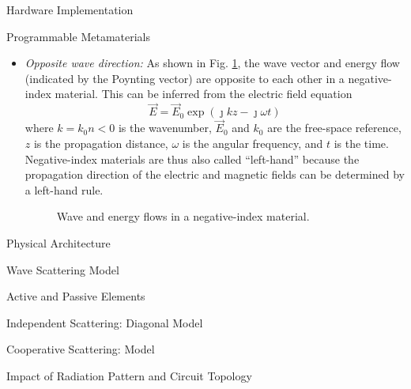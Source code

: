 \begin{section}{}
\begin{subsection}{Hardware Implementation}
\begin{subsubsection}{Programmable Metamaterials}
\begin{itemize}
				\item \emph{Opposite wave direction:} As shown in Fig. \ref{fg:nim_flows}, the wave vector and energy flow (indicated by the Poynting vector) are opposite to each other in a negative-index material. This can be inferred from the electric field equation
				\begin{equation}
					\vec{E} = \vec{E}_0 \exp(\jmath k z - \jmath \omega t)
				\end{equation}
				where $k = k_0 n < 0$ is the wavenumber, $\vec{E}_0$ and $k_0$ are the free-space reference, $z$ is the propagation distance, $\omega$ is the angular frequency, and $t$ is the time.
				Negative-index materials are thus also called ``left-hand'' because the propagation direction of the electric and magnetic fields can be determined by a left-hand rule.
				\begin{figure}[H]
					\centering
					\resizebox{0.5\columnwidth}{!}{
						
					}
					\caption{Wave and energy flows in a negative-index material.}
					\label{fg:nim_flows}
				\end{figure}
			\end{itemize}
		\end{subsubsection}

		\begin{subsubsection}{Physical Architecture}

		\end{subsubsection}
	\end{subsection}

	\begin{subsection}{Wave Scattering Model}
		\begin{subsubsection}{Active and Passive Elements}

		\end{subsubsection}

		\begin{subsubsection}{Independent Scattering: Diagonal Model}

		\end{subsubsection}

		\begin{subsubsection}{Cooperative Scattering:  Model}

		\end{subsubsection}

		\begin{subsubsection}{Impact of Radiation Pattern and Circuit Topology}

		\end{subsubsection}
	\end{subsection}

\end{section}

